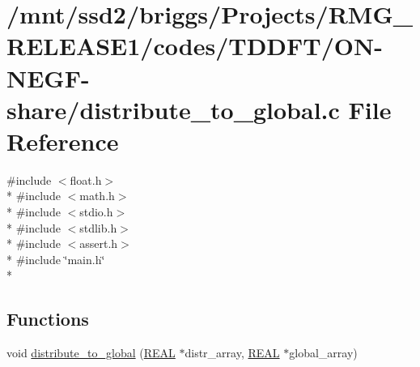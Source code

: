 \hypertarget{_t_d_d_f_t_2_o_n-_n_e_g_f-share_2distribute__to__global_8c}{\section{/mnt/ssd2/briggs/\-Projects/\-R\-M\-G\-\_\-\-R\-E\-L\-E\-A\-S\-E1/codes/\-T\-D\-D\-F\-T/\-O\-N-\/\-N\-E\-G\-F-\/share/distribute\-\_\-to\-\_\-global.c File Reference}
\label{_t_d_d_f_t_2_o_n-_n_e_g_f-share_2distribute__to__global_8c}
}
{\ttfamily \#include $<$float.\-h$>$}\\*
{\ttfamily \#include $<$math.\-h$>$}\\*
{\ttfamily \#include $<$stdio.\-h$>$}\\*
{\ttfamily \#include $<$stdlib.\-h$>$}\\*
{\ttfamily \#include $<$assert.\-h$>$}\\*
{\ttfamily \#include \char`\"{}main.\-h\char`\"{}}\\*
\subsection*{Functions}
\begin{DoxyCompactItemize}
\item 
void \hyperlink{_t_d_d_f_t_2_o_n-_n_e_g_f-share_2distribute__to__global_8c_a7b3e33e2409a9eff9e2924d3409ad699}{distribute\-\_\-to\-\_\-global} (\hyperlink{md_8h_a4b654506f18b8bfd61ad2a29a7e38c25}{R\-E\-A\-L} $\ast$distr\-\_\-array, \hyperlink{md_8h_a4b654506f18b8bfd61ad2a29a7e38c25}{R\-E\-A\-L} $\ast$global\-\_\-array)
\end{DoxyCompactItemize}


